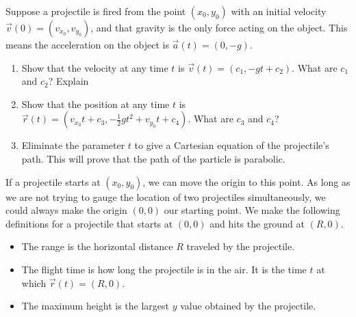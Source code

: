 \begin{problem}
%
Suppose a projectile is fired from the point $(x_0,y_0)$ with an initial velocity $\vec v(0)=(v_{x_0},v_{y_0})$, and that gravity is the only force acting on the object. This means the acceleration on the object is $\vec a(t) = (0,-g)$.
\begin{enumerate}
 \item Show that the velocity at any time $t$ is $\vec v(t) = (c_1,-gt+c_2)$. What are $c_1$ and $c_2$? Explain
 \item Show that the position at any time $t$ is $\vec r(t) = (v_{x_0}t+c_3, -\frac{1}{2}gt^2+v_{y_0}t+c_4)$. What are $c_3$ and $c_4$? 
 \item Eliminate the parameter $t$ to give a Cartesian equation of the projectile's path. This will prove that the path of the particle is parabolic.
\end{enumerate}
\end{problem}

If a projectile starts at $(x_0,y_0)$, we can move the origin to this point. As long as we are not trying to gauge the location of two projectiles simultaneously, we could always make the origin $(0,0)$ our starting point.   
We make the following definitions for a projectile that starts at $(0,0)$ and hits the ground at $(R,0)$.
\begin{itemize}
 \item The range is the horizontal distance $R$ traveled by the projectile.  
 \item The flight time is how long the projectile is in the air. It is the time $t$ at which $\vec r(t)=(R,0)$.
 \item The maximum height is the largest $y$ value obtained by the projectile. 
\end{itemize}


